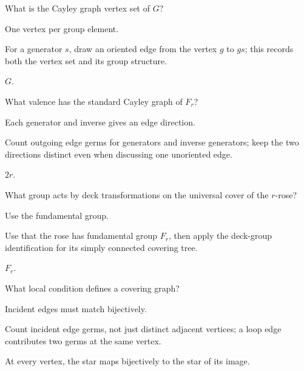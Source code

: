 \begin{exercise}\label{exr:viii14-13}
What is the Cayley graph vertex set of \(G\)?
\end{exercise}
\begin{hint}
One vertex per group element.

For a generator \(s\), draw an oriented edge from the vertex \(g\) to \(gs\); this records both the vertex set and its group structure.
\end{hint}
\begin{solution}
\(G\).
\end{solution}

\begin{exercise}\label{exr:viii14-14}
What valence has the standard Cayley graph of \(F_r\)?
\end{exercise}
\begin{hint}
Each generator and inverse gives an edge direction.

Count outgoing edge germs for generators and inverse generators; keep the two directions distinct even when discussing one unoriented edge.
\end{hint}
\begin{solution}
\(2r\).
\end{solution}

\begin{exercise}\label{exr:viii14-15}
What group acts by deck transformations on the universal cover of the \(r\)-rose?
\end{exercise}
\begin{hint}
Use the fundamental group.

Use that the rose has fundamental group \(F_r\), then apply the deck-group identification for its simply connected covering tree.
\end{hint}
\begin{solution}
\(F_r\).
\end{solution}

\begin{exercise}\label{exr:viii14-16}
What local condition defines a covering graph?
\end{exercise}
\begin{hint}
Incident edges must match bijectively.

Count incident edge germs, not just distinct adjacent vertices; a loop edge contributes two germs at the same vertex.
\end{hint}
\begin{solution}
At every vertex, the star maps bijectively to the star of its image.
\end{solution}


